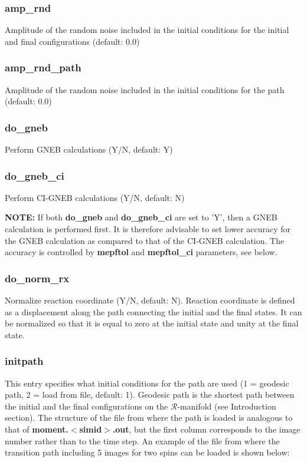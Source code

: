 \documentclass{article}
\begin{document}
\subsubsection*{amp\_rnd} 
Amplitude of the random noise included in the initial conditions for the initial and final configurations (default: 0.0)

\subsubsection*{amp\_rnd\_path} 
Amplitude of the random noise included in the initial conditions for the path (default: 0.0)

\subsubsection*{do\_gneb} 
Perform GNEB calculations (Y/N, default: Y)

\subsubsection*{do\_gneb\_ci}
Perform CI-GNEB calculations (Y/N, default: N)

{\bf NOTE:} If both {\bf do\_gneb} and {\bf do\_gneb\_ci} are set to 'Y', then a GNEB calculation is performed first. It is therefore advisable to set lower accuracy for the GNEB calculation as compared to that of the CI-GNEB calculation. The accuracy is controlled by {\bf mepftol} and {\bf mepftol\_ci} parameters, see below.

\subsubsection*{do\_norm\_rx}
Normalize reaction coordinate (Y/N, default: N). Reaction coordinate is defined as a displacement along the path connecting the initial and the final states. It can be normalized so that it is equal to zero at the initial state and unity at the final state.

\subsubsection*{initpath}
This entry specifies what initial conditions for the path are used (1 = geodesic path, 2 = load from file, default: 1). Geodesic path is the shortest path between the initial and the final configurations on the $\mathcal{R}$-manifold (see Introduction section). The structure of the file from where the path is loaded is analogous to that of {\bf moment.$<$simid$>$.out}, but the first column corresponds to the image number rather than to the time step. An example of the file from where the transition path including 5 images for two spins can be loaded is shown below:
\end{document}
